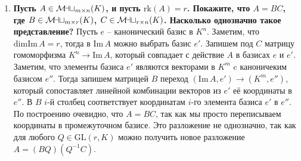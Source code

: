\documentclass{article}
\newcommand{\mymat}{\mathcal{M\mkern-3mu a\mkern-0.3mu t}}
\begin{document}
\begin{enumerate}
    \item \textbf{Пусть $A\in\mymat_{m\times n}(K)$, и пусть $\text{rk}(A)=r$.
        Покажите, что $A=BC$, где $B\in\mymat_{m\times r}(K)$, $C\in\mymat_{r
        \times n}(K)$. Насколько однозначно такое представление?}
        Пусть $e$ – канонический базис в $K^n$. Заметим, что $\text{dimIm}\,A=r$,
        тогда в $\text{Im}\,A$ можно выбрать базис $e'$. Запишем под $C$ матрицу
        гомоморфизма $K^n\rightarrow\text{Im}\,A$, который совпадает с действие
        $A$ в базисах $e$ и $e'$. Заметим, что элементы базиса $e'$ являются
        векторами в $K^m$ c каноничеким базисом $e''$. Тогда запишем матрицей
        $B$ переход $(\text{Im}\,A,e')\rightarrow(K^m,e'')$, который сопоставляет
        линейной комбинации векторов из $e'$ её координаты в $e''$. В $B$ $i$-й
        столбец соответствует координатам $i$-го элемента базиса $e'$ в $e''$.
        По построению очевидно, что $A=BC$, так как мы просто переписываем
        координаты в промежуточном базисе. Это разложение не однозначно, так
        как для любого $Q\in\text{GL}(r,K)$ можно получить новое разложение
        $A=(BQ)(Q^{-1}C)$.
    


\end{enumerate}
\end{document}
